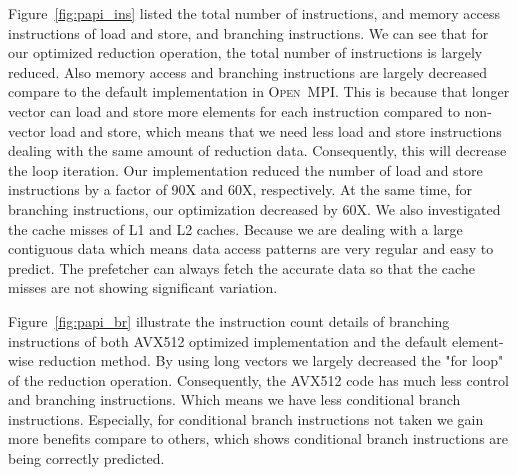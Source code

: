 \documentclass[sigconf,review]{acmart}
\newcommand{\ompi}[0]{\textsc{Open~MPI}\xspace}
\begin{document}
Figure~\ref{fig:papi_ins} listed the total number of instructions, and memory access instructions of
load and store, and branching instructions.
We can see that for our optimized reduction operation, the total number of
instructions is largely reduced. Also memory access and branching instructions
are largely decreased compare to the default implementation in \ompi.
This is because that longer vector can load and store more elements for each
instruction compared to non-vector load and store, which means that we need
less load and store instructions dealing with the same amount of reduction data.
Consequently, this will decrease the loop iteration.
Our implementation reduced the number of load and store instructions by a factor of
90X and 60X, respectively.
At the same time, for branching instructions, our optimization decreased by 60X.
We also investigated the cache misses of L1 and L2 caches. Because we are dealing with a large contiguous
data which means data access patterns are very regular and easy to predict.
The prefetcher can always fetch the accurate data so that the cache misses are not showing significant variation.

Figure~\ref{fig:papi_br} illustrate the instruction count details
of branching instructions of both AVX512 optimized implementation and the default
element-wise reduction method. By using long vectors we largely decreased the "for loop" of the reduction
operation. Consequently, the AVX512 code has much less control and branching instructions.
Which means we have less conditional branch instructions.
Especially, for conditional branch instructions not taken we gain
more benefits compare to others, which shows conditional branch instructions are being correctly predicted.



\end{document}
